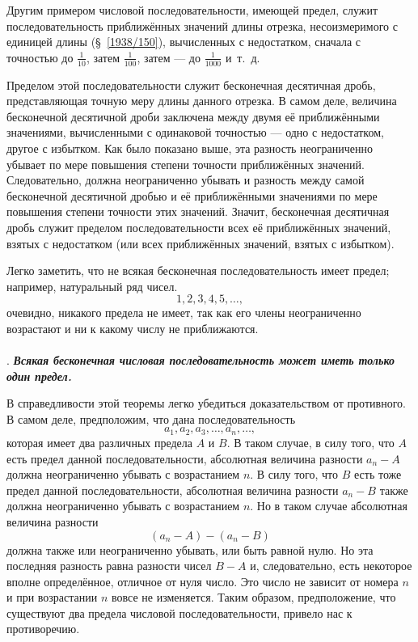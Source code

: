 \documentclass[oneside]{book}
\begin{document}
Другим примером числовой последовательности, имеющей предел, служит последовательность приближённых значений длины отрезка, несоизмеримого с единицей длины (§~\ref{1938/150}), вычисленных с недостатком, сначала с точностью до $\tfrac1{10}$, затем $\tfrac1{100}$, затем — до $\tfrac1{1000}$ и~т.~д.

Пределом этой последовательности служит бесконечная десятичная дробь, представляющая точную меру длины данного отрезка.
В самом деле, величина бесконечной десятичной дроби заключена между двумя её приближёнными значениями, вычисленными с одинаковой точностью — одно с недостатком, другое с избытком. 
Как было показано выше, эта разность неограниченно убывает по мере повышения степени точности приближённых значений.
Следовательно, должна неограниченно убывать и разность между самой бесконечной десятичной дробью и её приближёнными значениями по мере повышения степени точности этих значений.
Значит, бесконечная десятичная дробь служит пределом последовательности всех её приближённых значений, взятых с недостатком (или всех приближённых значений, взятых с избытком).

Легко заметить, что не всякая бесконечная последовательность имеет предел;
например, натуральный ряд чисел.
\[1, 2, 3, 4, 5,\dots,\]
очевидно, никакого предела не имеет, так как его члены неограниченно возрастают и ни к какому числу не приближаются.

\paragraph{}\label{1938/228}
.
\textbf{\emph{Всякая бесконечная числовая последовательность может иметь только один предел.}}

В справедливости этой теоремы легко убедиться доказательством от противного.
В самом деле, предположим, что дана последовательность
\[a_1,a_2,a_3,\dots,a_n,\dots,\]
которая имеет два различных предела $A$ и $B$.
В таком случае, в силу того, что $A$ есть предел данной последовательности, абсолютная величина разности $a_n-A$ должна неограниченно убывать с возрастанием $n$.
В силу того, что $B$ есть тоже предел данной последовательности, абсолютная величина разности $a_n-B$ также должна неограниченно убывать с возрастанием $n$.
Но в таком случае абсолютная величина разности
\[(a_n-A)-(a_n-B)\]
должна также или неограниченно убывать, или быть равной нулю.
Но эта последняя разность равна разности чисел $B-A$ и, следовательно, есть некоторое вполне определённое, отличное от нуля число.
Это число не зависит от номера $n$ и при возрастании $n$ вовсе не изменяется.
Таким образом, предположение, что существуют два предела числовой последовательности, привело нас к противоречию.
\end{document}
